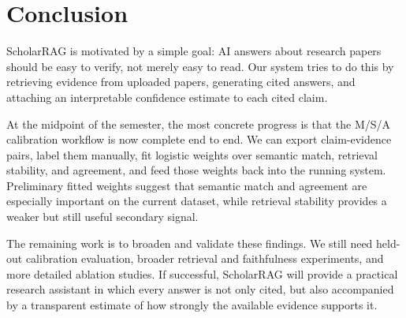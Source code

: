\documentclass[10pt]{article}
\begin{document}
\section{Conclusion}

ScholarRAG is motivated by a simple goal: AI answers about research
papers should be easy to verify, not merely easy to read. Our system
tries to do this by retrieving evidence from uploaded papers,
generating cited answers, and attaching an interpretable confidence
estimate to each cited claim.

At the midpoint of the semester, the most concrete progress is that the
M/S/A calibration workflow is now complete end to end. We can export
claim-evidence pairs, label them manually, fit logistic weights over
semantic match, retrieval stability, and agreement, and feed those
weights back into the running system. Preliminary fitted weights
suggest that semantic match and agreement are especially important on
the current dataset, while retrieval stability provides a weaker but
still useful secondary signal.

The remaining work is to broaden and validate these findings. We still
need held-out calibration evaluation, broader retrieval and
faithfulness experiments, and more detailed ablation studies. If
successful, ScholarRAG will provide a practical research assistant in
which every answer is not only cited, but also accompanied by a
transparent estimate of how strongly the available evidence supports
it.



\end{document}
